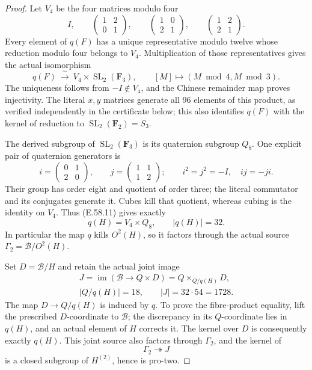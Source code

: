 \begin{proof}
Let \(V_4\) be the four matrices modulo four
\[
 I,\qquad
 \begin{pmatrix}1&2\\0&1\end{pmatrix},\qquad
 \begin{pmatrix}1&0\\2&1\end{pmatrix},\qquad
 \begin{pmatrix}1&2\\2&1\end{pmatrix}.
 \tag{E.58.10}
\]
Every element of \(q(F)\) has a unique representative modulo
twelve whose reduction modulo four belongs to \(V_4\).
Multiplication of those representatives gives the actual
isomorphism
\[
 q(F)\ \xrightarrow{\ \sim\ }\ 
 V_4\times\operatorname{SL}_2(\mathbf F_3),
 \qquad [M]\longmapsto(M\bmod4,M\bmod3).
 \tag{E.58.11}
\]
The uniqueness follows from \(-I\notin V_4\), and the
Chinese remainder map proves injectivity. The literal
\(x,y\) matrices generate all 96 elements of this product,
as verified independently in the certificate below; this
also identifies \(q(F)\) with the kernel of reduction to
\(\operatorname{SL}_2(\mathbf F_2)=S_3\).

The derived subgroup of \(\operatorname{SL}_2(\mathbf F_3)\)
is its quaternion subgroup \(Q_8\). One explicit pair of
quaternion generators is
\[
 i=\begin{pmatrix}0&1\\2&0\end{pmatrix},\qquad
 j=\begin{pmatrix}1&1\\1&2\end{pmatrix};\qquad
 i^2=j^2=-I,\quad ij=-ji.
 \tag{E.58.12}
\]
Their group has order eight and quotient of order three;
the literal commutator and its conjugates generate it.
Cubes kill that quotient, whereas cubing is the identity
on \(V_4\). Thus \textup{(E.58.11)} gives exactly
\[
                   q(H)=V_4\times Q_8,
                   \qquad |q(H)|=32.
 \tag{E.58.13}
\]
In particular the map \(q\) kills \(O^2(H)\), so it
factors through the actual source
\(\Gamma_2=\mathcal B/O^2(H)\).

Set \(D=\mathcal B/H\) and retain the actual joint image
\[
 \begin{gathered}
 J=\operatorname{im}(\mathcal B\to Q\times D)
       =Q\times_{Q/q(H)}D,\\
 |Q/q(H)|=18,\qquad |J|=32\cdot54=1728.
 \end{gathered}
 \tag{E.58.14}
\]
The map \(D\to Q/q(H)\) is induced by \(q\).
To prove the fibre-product equality, lift the prescribed
\(D\)-coordinate to \(\mathcal B\); the discrepancy in
its \(Q\)-coordinate lies in \(q(H)\), and an actual
element of \(H\) corrects it. The kernel over \(D\)
is consequently exactly \(q(H)\).
This joint source also factors through \(\Gamma_2\),
and the kernel of
\[
                         \Gamma_2\twoheadrightarrow J
 \tag{E.58.15}
\]
is a closed subgroup of \(H^{(2)}\), hence is pro-two.


\end{proof}
